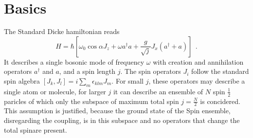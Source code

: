 \section{Basics}
The Standard Dicke hamiltonian reads
\begin{equation}
 H=\hbar \left[ \omega_0 \cos\alpha J_z + \omega a^\dagger a + \frac{g}{\sqrt{j}} J_x (a^\dagger + a) \right]~~.
\end{equation}
It describes a single bosonic mode of frequency $\omega$ with creation and annihilation operators $a^\dagger$ and $a$, and a spin length $j$.
The spin operators $ J_i$ follow the standard spin algebra $[J_k,J_l] = i \sum\limits_m \epsilon_{klm} J_m$. 
For small $j$, these operators may describe a single atom or molecule, for larger $j$ it can describe an ensemble of $N$ spin $\frac{1}{2}$ paricles of which only the subspace of maximum total spin $j = \frac{N}{2}$ is concidered.
This assumption is justified, because the ground state of the Spin ensemble, disregarding the coupling, is in this subspace and no operators that change the total spinare present.


